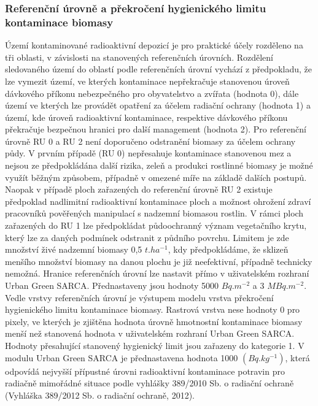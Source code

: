 \documentclass[letterpaper,10pt,english]{sphinxmanual}
\begin{document}
\subsubsection{Referenční úrovně a  překročení hygienického limitu kontaminace biomasy}
\label{\detokenize{description:referencni-urovne-a-prekroceni-hygienickeho-limitu-kontaminace-biomasy}}
Území kontaminované radioaktivní depozicí je pro praktické účely rozděleno na
tři oblasti, v závislosti na stanovených referenčních úrovních. Rozdělení
sledovaného území do oblastí podle referenčních úrovní vychází z předpokladu,
že lze vymezit území, ve kterých kontaminace nepřekračuje stanovenou úroveň
dávkového příkonu nebezpečného pro obyvatelstvo a zvířata (hodnota 0), dále
území ve kterých lze provádět opatření za účelem radiační ochrany (hodnota 1)
a území, kde úroveň radioaktivní kontaminace, respektive dávkového příkonu
překračuje bezpečnou hranici pro další management (hodnota 2).
Pro referenční úrovně RU 0 a RU 2 není doporučeno odstranění biomasy za
účelem ochrany půdy. V prvním případě (RU 0) nepřesahuje kontaminace
stanovenou mez a nejsou ze předpokládána další rizika, zeleň a produkci
rostlinné biomasy je možné využít běžným způsobem, případně v omezené míře na
základě dalších postupů. Naopak v případě ploch zařazených do referenční
úrovně RU 2 existuje předpoklad nadlimitní radioaktivní kontaminace ploch a
možnost ohrožení zdraví pracovníků pověřených manipulací s nadzemní biomasou
rostlin. V rámci ploch zařazených do RU 1 lze předpokládat půdoochranný
význam vegetačního krytu, který lze za daných podmínek odstranit z půdního
povrchu. Limitem je zde množství živé nadzemní biomasy 0,5 \(t.ha^{-1}\),
kdy předpokládáme, že sklizeň menšího množství biomasy na danou plochu je již
neefektivní, případně technicky nemožná. Hranice referenčních úrovní lze
nastavit přímo v uživatelském rozhraní Urban Green SARCA. Přednastaveny jsou
hodnoty 5000 \(Bq.m^{-2}\) a 3 \(MBq.m^{-2}\).
Vedle vrstvy referenčních úrovní je výstupem modelu vrstva překročení
hygienického limitu kontaminace biomasy. Rastrová vrstva nese hodnoty 0 pro
pixely, ve kterých je zjištěna hodnota úrovně hmotnostní kontaminace biomasy
menší než stanovená hodnota v uživatelském rozhraní Urban Green SARCA.
Hodnoty přesahující stanovený hygienický limit jsou zařazeny do kategorie 1.
V modulu Urban Green SARCA je přednastavena hodnota 1000 \((Bq.kg^{-1})\),
která odpovídá nejvyšší přípustné úrovni radioaktivní kontaminace potravin pro
radiačně mimořádné situace podle vyhlášky 389/2010 Sb. o radiační ochraně
(Vyhláška 389/2012 Sb. o radiační ochraně, 2012).
\end{document}

